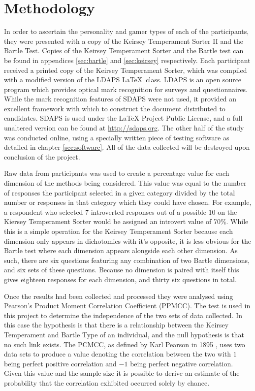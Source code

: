 \documentclass[12pt,a4paper,twoside]{report}
\begin{document}
\section{Methodology}
In order to ascertain the personality and gamer types of each of the participants, they were presented with a copy of the Keirsey Temperament Sorter II and the Bartle Test. Copies of the Keirsey Temperament Sorter and the Bartle test can be found in appendices \ref{sec:bartle} and \ref{sec:keirsey} respectively. Each participant received a printed copy of the Keirsey Temperament Sorter, which was compiled with a modified version of the LDAPS  \LaTeX \ class. LDAPS is an open source program which provides optical mark recognition for surveys and questionnaires. While the mark recognition features of SDAPS were not used, it provided an excellent framework with which to construct the document distributed to candidates. SDAPS is used under the LaTeX Project Public License, and a full unaltered version can be found at \url{http://sdaps.org}. The other half of the study was conducted online, using a specially written piece of testing software as detailed in chapter \ref{sec:software}. All of the data collected will be destroyed upon conclusion of the project.

Raw data from participants was used to create a percentage value for each dimension of the methods being considered. This value was equal to the number of responses the participant selected in a given category divided by the total number or responses in that category which they could have chosen. For example, a respondent who selected 7 introverted responses out of a possible 10 on the Kiersey Temperament Sorter would be assigned an introvert value of 70\%. While this is a simple operation for the Keirsey Temperament Sorter because each dimension only appears in dichotomies with it's opposite, it is less obvious for the Bartle test where each dimension appears alongside each other dimension. As such, there are six questions featuring any combination of two Bartle dimensions, and six sets of these questions. Because no dimension is paired with itself this gives eighteen responses for each dimension, and thirty six questions in total.

Once the results had been collected and processed they were analysed using Pearson's Product Moment Correlation Coefficient (PPMCC). The test is used in this project to determine the independence of the two sets of data collected. In this case the hypothesis is that there is a relationship between the Keirsey Temperament and Bartle Type of an individual, and the null hypothesis is that no such link exists. The PCMCC, as defined by Karl Pearson in 1895 \cite{pearson1895note}, uses two data sets to produce a value denoting the correlation between the two with $1$ being perfect positive correlation and $-1$ being perfect negative correlation. Given this value and the sample size it is possible to derive an estimate of the probability that the correlation exhibited occurred solely by chance. 
\end{document}
